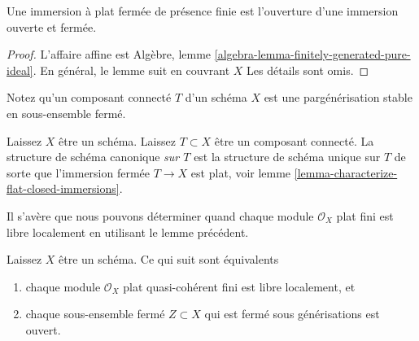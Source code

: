 \begin{lemma}

\label{lemma-flat-closed-immersions-finite-presentation}

Une immersion à plat fermée de présence finie est l'ouverture d'une immersion ouverte et fermée.

\end{lemma}

\begin{proof}

L'affaire affine est Algèbre, lemme \ref{algebra-lemma-finitely-generated-pure-ideal}. En général, le lemme suit en couvrant $X$ Les détails sont omis.

\end{proof}

\noindent
Notez qu'un composant connecté $T$ d'un schéma $X$ est une pargénérisation stable en sous-ensemble fermé.

\begin{definition}

\label{definition-scheme-structure-connected-component}
Laissez $X$ être un schéma. Laissez $T \subset X$ être un composant connecté. La structure de schéma canonique {\it sur $T$} est la structure de schéma unique sur $T$ de sorte que l'immersion fermée $T \to X$ est plat, voir lemme \ref{lemma-characterize-flat-closed-immersions}.
\end{definition}

\noindent
Il s'avère que nous pouvons déterminer quand chaque module $\mathcal{O}_X$ plat fini est libre localement en utilisant le lemme précédent.

\begin{lemma}

\label{lemma-finite-flat-is-finite-locally-free}
Laissez $X$ être un schéma. Ce qui suit sont équivalents
\begin{enumerate}
\item chaque module $\mathcal{O}_X$ plat quasi-cohérent fini est libre localement, et
\item chaque sous-ensemble fermé $Z \subset X$ qui est fermé sous générisations est ouvert.
\end{enumerate}

\end{lemma}

